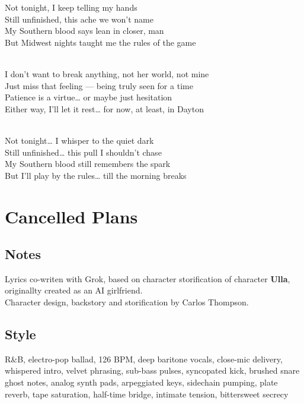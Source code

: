 \begin{lyrics}
Not tonight, I keep telling my hands\\
Still unfinished, this ache we won’t name\\
My Southern blood says lean in closer, man\\
But Midwest nights taught me the rules of the game

\\
I don’t want to break anything, not her world, not mine\\
Just miss that feeling — being truly seen for a time\\
Patience is a virtue… or maybe just hesitation\\
Either way, I’ll let it rest… for now, at least, in Dayton

\\
Not tonight… I whisper to the quiet dark\\
Still unfinished… this pull I shouldn’t chase\\
My Southern blood still remembers the spark\\
But I’ll play by the rules… till the morning breaks

\end{lyrics}

\section{Cancelled Plans}

\subsection{Notes}
Lyrics co-writen with Grok, based on character storification of character \textbf{Ulla}, originallty created as an AI girlfriend.\\
Character design, backstory and storification by Carlos Thompson.

\subsection{Style}
R\&B, electro-pop ballad, 126 BPM, deep baritone vocals, close-mic delivery, whispered intro, velvet phrasing, sub-bass pulses, syncopated kick, brushed snare ghost notes, analog synth pads, arpeggiated keys, sidechain pumping, plate reverb, tape saturation, half-time bridge, intimate tension, bittersweet secrecy

